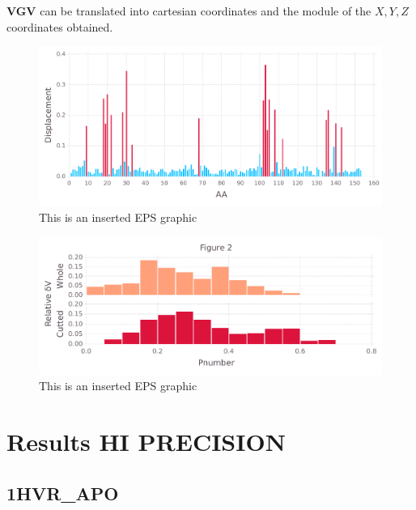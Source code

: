 \documentclass[10pt,letterpaper]{article}
\begin{document}
\FloatBarrier


\textbf{VGV} can be translated into cartesian coordinates and the module of the \(X, Y, Z\) coordinates obtained.

\begin{figure}[ht]
\begin{center}
\includegraphics[scale=0.5]{256l/5figure.pdf}
\caption{This is an inserted EPS graphic}
\label{fig13}
\end{center}
\end{figure}
              
\begin{figure}[ht]
\begin{center}
\includegraphics[scale=0.5]{256l/3both_figure.pdf}
\caption{This is an inserted EPS graphic}
\label{fig13}
\end{center}
\end{figure}

\FloatBarrier
\newpage

\section{Results HI PRECISION}
\subsection{1HVR\_APO}
\end{document}
